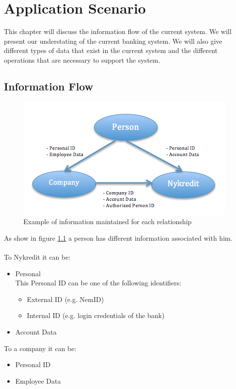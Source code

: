\chapter{Application Scenario}

This chapter will discuss the information flow of the current system. We will present our understating of the current banking system. We will also give different types of data that exist in the current system and the different operations that are necessary to support the system.
\section{Information Flow}
\begin{figure}[h]
	\centering
	\includegraphics[width=\textwidth]{figures/Flow}
	\caption{Example of information maintained for each relationship}
	\label{fig:Flow}
\end{figure}
As show in figure \ref{fig:Flow} a person has different information associated with him. 
\\
\\To Nykredit it can be:
\begin{itemize}
	\item Personal
	 \\This Personal ID can be one of the following identifiers:
	\begin{itemize}
		\item	External ID (e.g. NemID)
		\item Internal ID (e.g. login credentials of the bank)
	\end{itemize}
\item Account Data
\end{itemize}
To a company it can be:
\begin{itemize}
	\item Personal ID
	\item Employee Data
\end{itemize}
